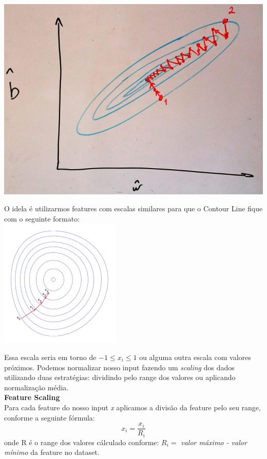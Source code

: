 \documentclass[11pt,a4paper,leqno]{article}
\begin{document}
\includegraphics[scale=0.3]{Images/gradiente_descendente_contour_ruim.jpeg} 

O idela é utilizarmos features com escalas similares para que o Contour Line fique com o seguinte formato:\\
\includegraphics[scale=0.5]{Images/gradiente_descendente_contour_ideal.png} 

Essa escala seria em torno de $-1 \leq x_i \leq 1$ ou alguma outra escala com valores próximos.
Podemos normalizar nosso input fazendo um \emph{scaling} dos dados utilizando duas estratégias: dividindo pelo range dos valores ou aplicando normalização média.
\\

\textbf{Feature Scaling}\\
Para cada feature do nosso input \emph{x} aplicamos a divisão da feature pelo seu range, conforme a seguinte fórmula:
\[
x_i = \frac{x_i}{R_i}
\]
onde R é o range dos valores cálculado conforme: $R_i =$ \emph{valor máximo - valor mínimo} da feature no dataset.
\\
\end{document}
